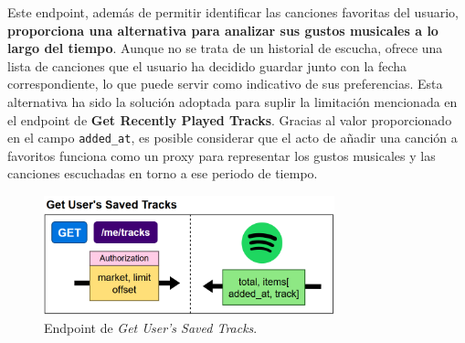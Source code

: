 Este endpoint, además de permitir identificar las canciones favoritas del usuario, \textbf{proporciona una alternativa para analizar sus gustos musicales a lo largo del tiempo}. Aunque no se trata de un historial de escucha, ofrece una lista de canciones que el usuario ha decidido guardar junto con la fecha correspondiente, lo que puede servir como indicativo de sus preferencias. Esta alternativa ha sido la solución adoptada para suplir la limitación mencionada en el endpoint de \textbf{Get Recently Played Tracks}. Gracias al valor proporcionado en el campo \texttt{added\_at}, es posible considerar que el acto de añadir una canción a favoritos funciona como un proxy para representar los gustos musicales y las canciones escuchadas en torno a ese periodo de tiempo.

\begin{figure}[H]
    \centering
    \includegraphics[width=0.75\textwidth]{figures/endpoints/get_users_saved_tracks.png}
    \caption{Endpoint de \textit{Get User's Saved Tracks}.}
    \label{fig:get_usr_saved_tracks}
\end{figure}

